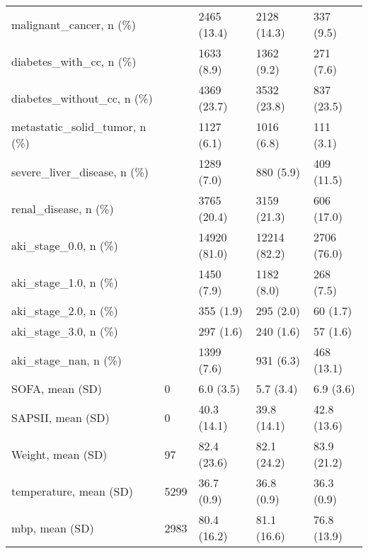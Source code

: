 \begin{tabular}{lllll}
malignant\_cancer, n (\%)                           &         &    2465 (13.4) &       2128 (14.3) &              337 (9.5) \\
diabetes\_with\_cc, n (\%)                           &         &     1633 (8.9) &        1362 (9.2) &              271 (7.6) \\
diabetes\_without\_cc, n (\%)                        &         &    4369 (23.7) &       3532 (23.8) &             837 (23.5) \\
metastatic\_solid\_tumor, n (\%)                     &         &     1127 (6.1) &        1016 (6.8) &              111 (3.1) \\
severe\_liver\_disease, n (\%)                       &         &     1289 (7.0) &         880 (5.9) &             409 (11.5) \\
renal\_disease, n (\%)                              &         &    3765 (20.4) &       3159 (21.3) &             606 (17.0) \\
aki\_stage\_0.0, n (\%)                              &         &   14920 (81.0) &      12214 (82.2) &            2706 (76.0) \\
aki\_stage\_1.0, n (\%)                              &         &     1450 (7.9) &        1182 (8.0) &              268 (7.5) \\
aki\_stage\_2.0, n (\%)                              &         &      355 (1.9) &         295 (2.0) &               60 (1.7) \\
aki\_stage\_3.0, n (\%)                              &         &      297 (1.6) &         240 (1.6) &               57 (1.6) \\
aki\_stage\_nan, n (\%)                              &         &     1399 (7.6) &         931 (6.3) &             468 (13.1) \\
SOFA, mean (SD)                                   &       0 &      6.0 (3.5) &         5.7 (3.4) &              6.9 (3.6) \\
SAPSII, mean (SD)                                 &       0 &    40.3 (14.1) &       39.8 (14.1) &            42.8 (13.6) \\
Weight, mean (SD)                                 &      97 &    82.4 (23.6) &       82.1 (24.2) &            83.9 (21.2) \\
temperature, mean (SD)                            &    5299 &     36.7 (0.9) &        36.8 (0.9) &             36.3 (0.9) \\
mbp, mean (SD)                                    &    2983 &    80.4 (16.2) &       81.1 (16.6) &            76.8 (13.9) \\

\end{tabular}
